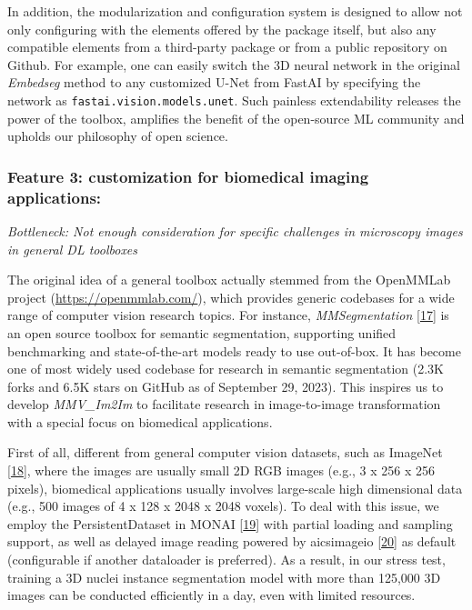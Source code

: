 In addition, the modularization and configuration system is designed to allow not only configuring with the elements offered by the package itself, but also any compatible elements from a third-party package or from a public repository on Github. For example, one can easily switch the 3D neural network in the original \emph{Embedseg} method to any customized U-Net from FastAI by specifying the network as \texttt{fastai.vision.models.unet}. Such painless extendability releases the power of the toolbox, amplifies the benefit of the open-source ML community and upholds our philosophy of open science.

\hypertarget{feature-3-customization-for-biomedical-imaging-applications}{%
\subsubsection{Feature 3: customization for biomedical imaging applications:}\label{feature-3-customization-for-biomedical-imaging-applications}}

\emph{Bottleneck: Not enough consideration for specific challenges in microscopy images in general DL toolboxes}

The original idea of a general toolbox actually stemmed from the OpenMMLab project (\url{https://openmmlab.com/}), which provides generic codebases for a wide range of computer vision research topics. For instance, \emph{MMSegmentation} {[}\protect\hyperlink{ref-EcizztLg}{17}{]} is an open source toolbox for semantic segmentation, supporting unified benchmarking and state-of-the-art models ready to use out-of-box. It has become one of most widely used codebase for research in semantic segmentation (2.3K forks and 6.5K stars on GitHub as of September 29, 2023). This inspires us to develop \emph{MMV\_Im2Im} to facilitate research in image-to-image transformation with a special focus on biomedical applications.

First of all, different from general computer vision datasets, such as ImageNet {[}\protect\hyperlink{ref-lt4BNUoG}{18}{]}, where the images are usually small 2D RGB images (e.g., 3 x 256 x 256 pixels), biomedical applications usually involves large-scale high dimensional data (e.g., 500 images of 4 x 128 x 2048 x 2048 voxels). To deal with this issue, we employ the PersistentDataset in MONAI {[}\protect\hyperlink{ref-UU62HYC6}{19}{]} with partial loading and sampling support, as well as delayed image reading powered by aicsimageio {[}\protect\hyperlink{ref-gsfWGJKf}{20}{]} as default (configurable if another dataloader is preferred). As a result, in our stress test, training a 3D nuclei instance segmentation model with more than 125,000 3D images can be conducted efficiently in a day, even with limited resources.

